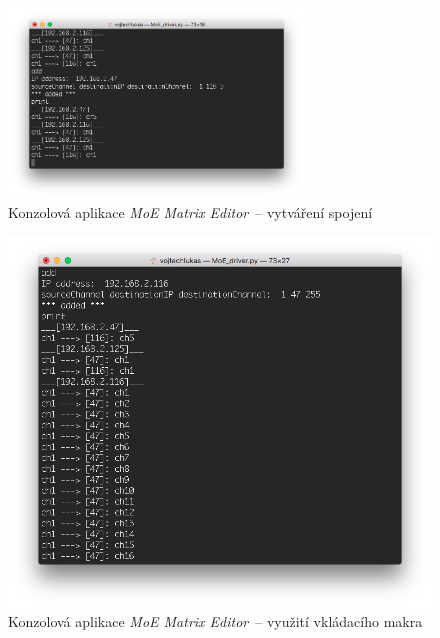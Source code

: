 \begin{figure}[p]
    \centering
    \includegraphics[width=0.7\textwidth]{obrazky/MoE_Editor_2.png}
    \caption{Konzolová aplikace \emph{MoE Matrix Editor}~-- vytváření spojení}
\end{figure}

\begin{figure}[p]
    \centering
    \includegraphics[width=.7\textwidth]{obrazky/MoE_editor_3.png}
    \caption{Konzolová aplikace \emph{MoE Matrix Editor}~-- využití vkládacího makra}
\end{figure}
